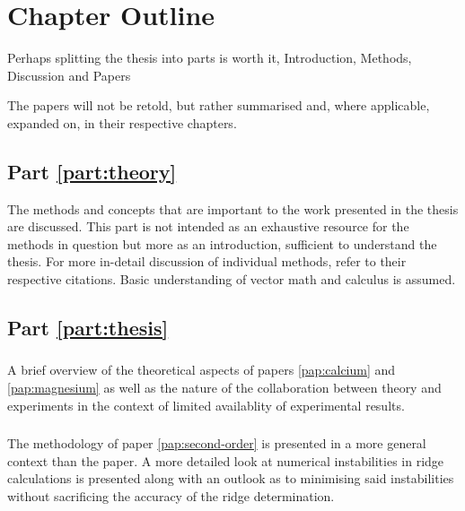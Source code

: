 \section{Chapter Outline}
\label{sec:chapters}

Perhaps splitting the thesis into parts is worth it, Introduction, Methods, Discussion and Papers

The papers will not be retold, but rather summarised and, where applicable, expanded on, in their respective chapters.

\subsection{Part \ref{part:theory}}
The methods and concepts that are important to the work presented in the thesis are discussed.
This part is not intended as an exhaustive resource for the methods in question but more as an introduction, sufficient to understand the thesis.
For more in-detail discussion of individual methods, refer to their respective citations.
Basic understanding of vector math and calculus is assumed.

\subsubsection{}
\subsubsection{}
\subsubsection{}


\subsection{Part \ref{part:thesis}}
\subsubsection{}
A brief overview of the theoretical aspects of papers \ref{pap:calcium} and \ref{pap:magnesium} as well as the nature of the collaboration between theory and experiments in the context of limited availablity of experimental results.

\subsubsection{}
The methodology of paper \ref{pap:second-order} is presented in a more general context than the paper.
A more detailed look at numerical instabilities in ridge calculations is presented along with an outlook as to minimising said instabilities without sacrificing the accuracy of the ridge determination.

